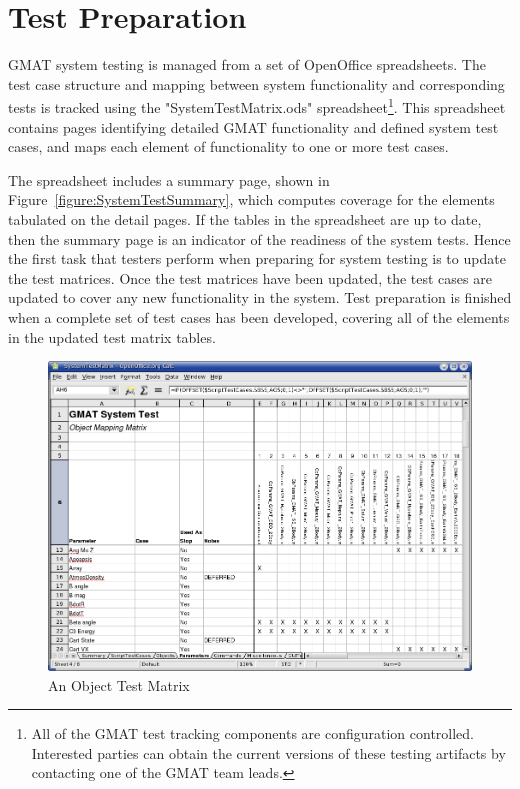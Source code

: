 \section{Test Preparation}

GMAT system testing is managed from a set of OpenOffice\cite{OOo} spreadsheets.  The test case
structure and mapping between system functionality and corresponding tests is tracked using the
"SystemTestMatrix.ods" spreadsheet\footnote{All of the GMAT test tracking components are
configuration controlled.  Interested parties can obtain the current versions of these testing
artifacts by contacting one of the GMAT team leads.}. This spreadsheet contains pages identifying
detailed GMAT functionality and defined system test cases, and maps each element of functionality to
one or more test cases.

The spreadsheet includes a summary page, shown in Figure~\ref{figure:SystemTestSummary}, which
computes coverage for the elements tabulated on the detail pages.  If the tables in the spreadsheet
are up to date, then the summary page is an indicator of the readiness of the system tests.  Hence
the first task that testers perform when preparing for system testing is to update the test
matrices.  Once the test matrices have been updated, the test cases are updated to cover any new
functionality in the system.  Test preparation is finished when a complete set of test cases has
been developed, covering all of the elements in the updated test matrix tables.

\begin{figure}[htb]
\begin{center}
\includegraphics[400,300]{Images/ComponentTestMatrix.png}
\caption{\label{figure:ComponentTestMatrix}An Object Test Matrix}
\end{center}
\end{figure}

